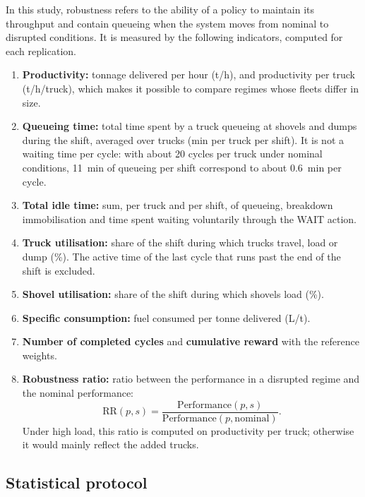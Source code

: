 \documentclass[11pt,a4paper]{article}
\newif\ifrevmarks
\newcommand{\revtag}[1]{\ifrevmarks\textsuperscript{\textcolor{red!70!black}{\scriptsize[#1]}}\fi}
\newcommand{\rev}[2]{\ifrevmarks{\color{revcolor}#2}\revtag{#1}\else#2\fi}
\newenvironment{revbloc}[1]{\par\ifrevmarks\color{revcolor}\noindent\revtag{#1}\ \fi}{\par}
\newif\ifcorrmarks
\newcommand{\corr}[1]{\ifcorrmarks\textcolor{corrcolor}{#1}\else#1\fi}
\begin{document}
\begin{revbloc}{M2, M21, M15, m18}
\corr{In this study, robustness refers to} the ability of a policy to maintain its throughput and contain queueing when the system moves from nominal to disrupted conditions. It is measured by the following indicators, computed for each replication.

\begin{enumerate}
  \item \textbf{Productivity:} tonnage delivered per hour (t/h), and productivity per truck (t/h/truck), which makes it possible to compare regimes whose fleets differ in size.
  \item \textbf{Queueing time:} total time spent by a truck queueing at shovels and dumps during the shift, averaged over trucks (min per truck per shift). It is not a waiting time per cycle: \rev{T31}{with about 20 cycles per truck under nominal conditions, 11~min of queueing per shift correspond to about 0.6~min per cycle.}
  \item \textbf{Total idle time:} sum, per truck and per shift, of queueing, breakdown immobilisation and time spent waiting voluntarily through the WAIT action.
  \item \textbf{Truck utilisation:} share of the shift during which trucks travel, load or dump (\%). The active time of the last cycle that runs past the end of the shift is excluded.
  \item \textbf{Shovel utilisation:} share of the shift during which shovels load (\%).
  \item \textbf{Specific consumption:} fuel consumed per tonne delivered (L/t).
  \item \textbf{Number of completed cycles} and \textbf{cumulative reward} with the reference weights.
  \item \textbf{Robustness ratio:} ratio between the performance in a disrupted regime and the nominal performance:
  \begin{equation}
  \mathrm{RR}(p,s) = \frac{\mathrm{Performance}(p,s)}{\mathrm{Performance}(p,\mathrm{nominal})} .
  \label{eq:rr}
  \end{equation}
  Under high load, this ratio is computed on productivity per truck; otherwise it would mainly reflect the added trucks.
\end{enumerate}
\end{revbloc}

\subsection{Statistical protocol}
\label{sec:proto}
\end{document}
